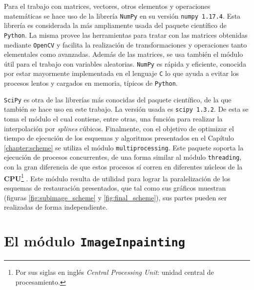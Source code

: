 Para el trabajo con matrices, vectores, otros elementos y operaciones matem\'aticas se hace uso de la librer\'ia \texttt{NumPy} en su versi\'on \texttt{numpy 1.17.4}. Esta librer\'ia es considerada la m\'as ampliamente usada del paquete científico de \texttt{Python}. La misma provee las herramientas para tratar con las matrices obtenidas mediante \texttt{OpenCV} y facilita la realización de transformaciones y operaciones tanto elementales como avanzadas. Adem\'as de las matrices, se usa tambi\'en el m\'odulo  \'util para el trabajo con variables aleatorias. \texttt{NumPy} es r\'apida y eficiente, conocida por estar mayormente implementada en el lenguaje \texttt{C} lo que ayuda a evitar los procesos lentos y cargados en memoria, t\'ipicos de \texttt{Python}.

\texttt{SciPy} es otra de las librer\'ias m\'as conocidas del paquete científico, de la que tambi\'en se hace uso en este trabajo. La versión usada es \texttt{scipy 1.3.2}. De esta se toma el m\'odulo  el cual contiene, entre otras, una funci\'on para realizar la interpolaci\'on por \textit{splines} c\'ubicos. Finalmente, con el objetivo de optimizar el tiempo de ejecuci\'on de los esquemas y algoritmos presentados en el Cap\'itulo \ref{chapter:scheme} se utiliza el m\'odulo \texttt{multiprocessing}. Este paquete soporta la ejecuci\'on de procesos concurrentes, de una forma similar al m\'odulo \texttt{threading}, con la gran diferencia de que estos procesos s\'i corren en diferentes n\'ucleos de la \textbf{CPU}\footnote{Por sus siglas en ingl\'es \textit{Central Processing Unit}: unidad central de procesamiento.} \cite{o2008brief}. Este m\'odulo resulta de utilidad para lograr la paralelizaci\'on de los esquemas de restauraci\'on presentados, que tal como sus gr\'aficos muestran (figuras \ref{fig:subimage_scheme} y \ref{fig:final_scheme}), sus partes pueden ser realizadas de forma independiente.

\section{El m\'odulo \texttt{ImageInpainting}}\label{sec:imageinpainting_module}

